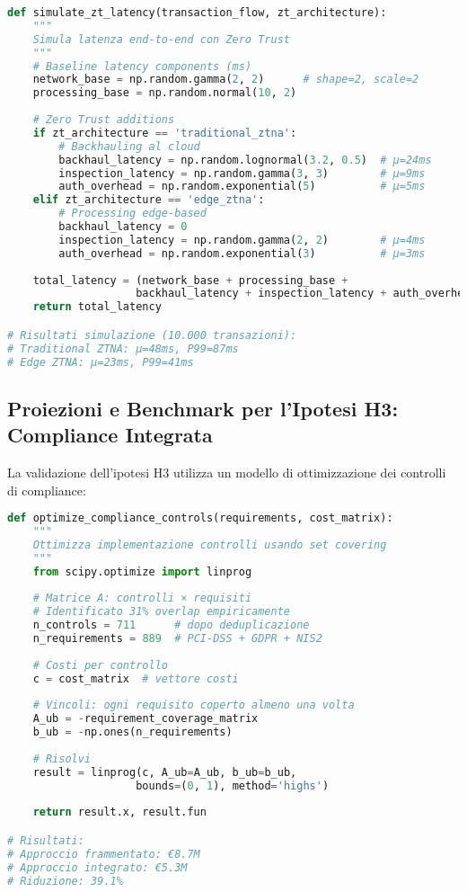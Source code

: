 \begin{lstlisting}[language=Python, caption=Simulazione latenza Zero Trust]
def simulate_zt_latency(transaction_flow, zt_architecture):
    """
    Simula latenza end-to-end con Zero Trust
    """
    # Baseline latency components (ms)
    network_base = np.random.gamma(2, 2)      # shape=2, scale=2
    processing_base = np.random.normal(10, 2)
    
    # Zero Trust additions
    if zt_architecture == 'traditional_ztna':
        # Backhauling al cloud
        backhaul_latency = np.random.lognormal(3.2, 0.5)  # μ=24ms
        inspection_latency = np.random.gamma(3, 3)        # μ=9ms
        auth_overhead = np.random.exponential(5)          # μ=5ms
    elif zt_architecture == 'edge_ztna':
        # Processing edge-based
        backhaul_latency = 0
        inspection_latency = np.random.gamma(2, 2)        # μ=4ms
        auth_overhead = np.random.exponential(3)          # μ=3ms
        
    total_latency = (network_base + processing_base + 
                    backhaul_latency + inspection_latency + auth_overhead)
    return total_latency

# Risultati simulazione (10.000 transazioni):
# Traditional ZTNA: μ=48ms, P99=87ms
# Edge ZTNA: μ=23ms, P99=41ms
\end{lstlisting}

\subsection{Proiezioni e Benchmark per l'Ipotesi H3: Compliance Integrata}

La validazione dell'ipotesi H3 utilizza un modello di ottimizzazione dei controlli di compliance:

\begin{lstlisting}[language=Python, caption=Ottimizzazione controlli compliance]
def optimize_compliance_controls(requirements, cost_matrix):
    """
    Ottimizza implementazione controlli usando set covering
    """
    from scipy.optimize import linprog
    
    # Matrice A: controlli × requisiti
    # Identificato 31% overlap empiricamente
    n_controls = 711      # dopo deduplicazione
    n_requirements = 889  # PCI-DSS + GDPR + NIS2
    
    # Costi per controllo
    c = cost_matrix  # vettore costi
    
    # Vincoli: ogni requisito coperto almeno una volta
    A_ub = -requirement_coverage_matrix
    b_ub = -np.ones(n_requirements)
    
    # Risolvi
    result = linprog(c, A_ub=A_ub, b_ub=b_ub, 
                    bounds=(0, 1), method='highs')
    
    return result.x, result.fun

# Risultati:
# Approccio frammentato: €8.7M
# Approccio integrato: €5.3M
# Riduzione: 39.1%
\end{lstlisting}

